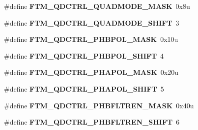 \begin{DoxyCompactItemize}
\item 
\#define {\bfseries F\+T\+M\+\_\+\+Q\+D\+C\+T\+R\+L\+\_\+\+Q\+U\+A\+D\+M\+O\+D\+E\+\_\+\+M\+A\+SK}~0x8u\hypertarget{group__FTM__Register__Masks_gaaee693e052290f94ba226027a39f3bbd}{}\label{group__FTM__Register__Masks_gaaee693e052290f94ba226027a39f3bbd}

\item 
\#define {\bfseries F\+T\+M\+\_\+\+Q\+D\+C\+T\+R\+L\+\_\+\+Q\+U\+A\+D\+M\+O\+D\+E\+\_\+\+S\+H\+I\+FT}~3\hypertarget{group__FTM__Register__Masks_ga70e29e6856263443f9415464e8c88d35}{}\label{group__FTM__Register__Masks_ga70e29e6856263443f9415464e8c88d35}

\item 
\#define {\bfseries F\+T\+M\+\_\+\+Q\+D\+C\+T\+R\+L\+\_\+\+P\+H\+B\+P\+O\+L\+\_\+\+M\+A\+SK}~0x10u\hypertarget{group__FTM__Register__Masks_ga58a390751189f10795710f0726e42685}{}\label{group__FTM__Register__Masks_ga58a390751189f10795710f0726e42685}

\item 
\#define {\bfseries F\+T\+M\+\_\+\+Q\+D\+C\+T\+R\+L\+\_\+\+P\+H\+B\+P\+O\+L\+\_\+\+S\+H\+I\+FT}~4\hypertarget{group__FTM__Register__Masks_gafd01650a0aa5dc97f5a738b70654944e}{}\label{group__FTM__Register__Masks_gafd01650a0aa5dc97f5a738b70654944e}

\item 
\#define {\bfseries F\+T\+M\+\_\+\+Q\+D\+C\+T\+R\+L\+\_\+\+P\+H\+A\+P\+O\+L\+\_\+\+M\+A\+SK}~0x20u\hypertarget{group__FTM__Register__Masks_gab8076d97d00af4a3e87a542af63bf45a}{}\label{group__FTM__Register__Masks_gab8076d97d00af4a3e87a542af63bf45a}

\item 
\#define {\bfseries F\+T\+M\+\_\+\+Q\+D\+C\+T\+R\+L\+\_\+\+P\+H\+A\+P\+O\+L\+\_\+\+S\+H\+I\+FT}~5\hypertarget{group__FTM__Register__Masks_ga22621810bf1d949ef10f337e826a6649}{}\label{group__FTM__Register__Masks_ga22621810bf1d949ef10f337e826a6649}

\item 
\#define {\bfseries F\+T\+M\+\_\+\+Q\+D\+C\+T\+R\+L\+\_\+\+P\+H\+B\+F\+L\+T\+R\+E\+N\+\_\+\+M\+A\+SK}~0x40u\hypertarget{group__FTM__Register__Masks_ga5458826b9d2a62a17c2fca3c13fd45c5}{}\label{group__FTM__Register__Masks_ga5458826b9d2a62a17c2fca3c13fd45c5}

\item 
\#define {\bfseries F\+T\+M\+\_\+\+Q\+D\+C\+T\+R\+L\+\_\+\+P\+H\+B\+F\+L\+T\+R\+E\+N\+\_\+\+S\+H\+I\+FT}~6\hypertarget{group__FTM__Register__Masks_gaf6681fd1dc7277fba2da13be8c2a46e7}{}\label{group__FTM__Register__Masks_gaf6681fd1dc7277fba2da13be8c2a46e7}


\end{DoxyCompactItemize}

